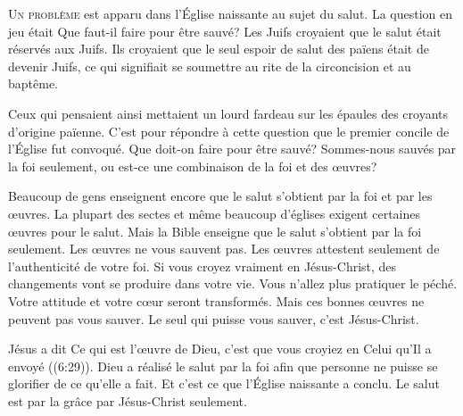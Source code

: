 



\lettrine{U}{n problème} est apparu dans l'Église  naissante
 au sujet du salut. La question en jeu était\frcolon{} 
 \Og Que faut-il faire pour être sauvé? \Fg{}
 Les Juifs croyaient que le salut était réservés aux Juifs.
 Ils croyaient que le seul espoir de salut des païens était de devenir Juifs,
 ce qui signifiait se soumettre au rite de la circoncision et au baptême.

Ceux qui pensaient ainsi mettaient un lourd fardeau sur les épaules
 des croyants d'origine païenne. C'est pour répondre à cette question
 que le premier concile de l'Église fut convoqué. 
 Que doit-on faire pour être sauvé? Sommes-nous sauvés par la foi seulement,
 ou est-ce une combinaison de la foi et des \oe{}uvres?


Beaucoup de gens enseignent encore que le salut s'obtient par la foi
 et par les \oe{}uvres. La plupart des sectes et même beaucoup d'églises
 exigent certaines \oe{}uvres pour le salut.
 Mais la Bible enseigne que le salut s'obtient par la foi seulement.
 Les \oe{}uvres ne vous sauvent pas. Les \oe{}uvres attestent seulement
 de l'authenticité de votre foi. Si vous croyez vraiment en Jésus-Christ,
 des changements vont se produire dans votre vie. Vous n'allez plus pratiquer
 le péché. Votre attitude et votre c\oe{}ur seront transformés.
 Mais ces bonnes \oe{}uvres ne peuvent pas vous sauver.
 Le seul qui puisse vous sauver, c'est Jésus-Christ.

Jésus a dit\frcolon{} 
 \Og Ce qui est l'\oe{}uvre de Dieu, c'est que vous croyiez en Celui
 qu'Il a envoyé \Fg{} ((6:29)).
 Dieu a réalisé le salut par la foi afin que personne ne puisse
 se glorifier de ce qu'elle a fait. Et c'est ce que l'Église 
 naissante a conclu. Le salut est par la grâce \ocadr par Jésus-Christ seulement.

\dvrule


